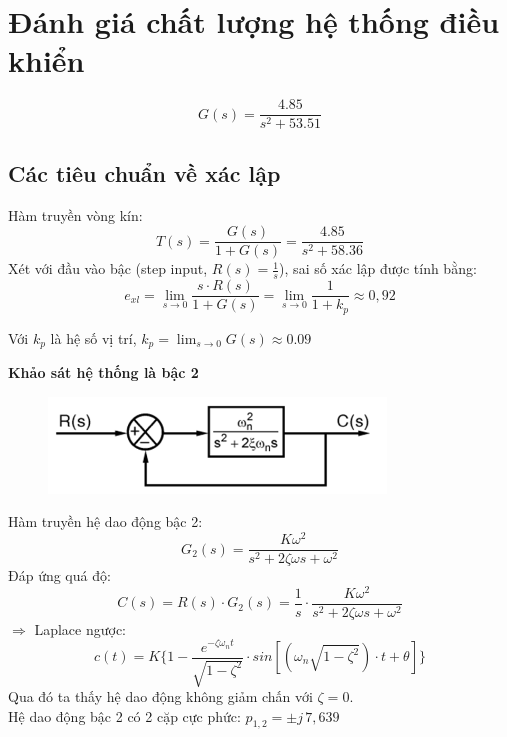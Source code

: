 \chapter{Đánh giá chất lượng hệ thống điều khiển}
\[
    G(s) = \frac{4.85}{s^2 + 53.51}
\]
\section{Các tiêu chuẩn về xác lập}
Hàm truyền vòng kín:
\[
    T(s) = \frac{G(s)}{1+G(s)} = \frac{4.85}{s^2 + 58.36}
\]
Xét với đầu vào bậc (step input, $R(s)=\frac{1}{s}$), sai số xác lập được tính bằng:
\[
e_{xl} = \lim_{s \to 0} \frac{s \cdot R(s)}{1 + G(s)} 
= \lim_{s \to 0} \frac{1}{1 + k_p} \approx 0{,}92
\]
\begin{center}
    Với $k_p$  là hệ số vị trí, $k_p = \lim_{s \to 0} G(s) \approx 0.09$ 
\end{center}
\textbf{Khảo sát hệ thống là bậc 2}
\begin{figure}[H]
    \centering
    \includegraphics[width=0.8\textwidth]{pictures/closeloop.png}
\end{figure}

Hàm truyền hệ dao động bậc 2:
\[
    G_2(s) = \frac{K\omega^2}{s^2+2\zeta \omega s + \omega^2}
\]
Đáp ứng quá độ:
\[
    C(s) = R(s)\cdot G_2(s) = \frac{1}{s}\cdot \frac{K\omega^2}{s^2+2\zeta \omega s + \omega^2}
\]
$\Rightarrow$ Laplace ngược: 
\[
    c(t) = K\{1-\frac{e^{-\zeta \omega_n t}}{\sqrt{1-\zeta^2}}\cdot sin[(\omega_n\sqrt{1-\zeta^2})\cdot t+\theta] \}
\]
Qua đó ta thấy hệ dao động không giảm chấn với $\zeta = 0$.\\
Hệ dao động bậc 2 có 2 cặp cực phức: $p_{1,2} = \pm j\,7{,}639$ \\

